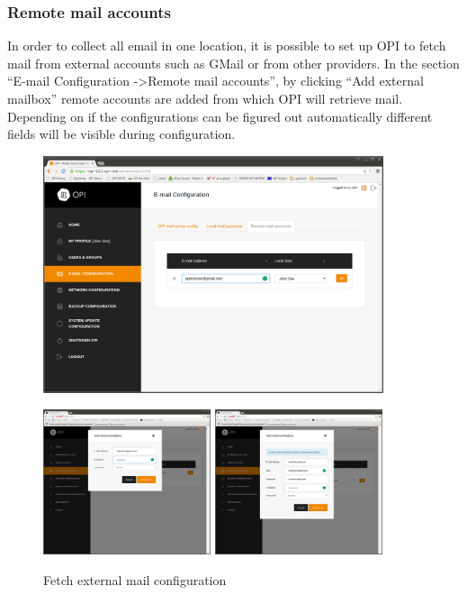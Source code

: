 \documentclass[12pt,a4paper,titlepage]{article}
\begin{document}
\subsubsection{Remote mail accounts}
In order to collect all email in one location, it is possible to set up OPI to fetch mail from external accounts such as GMail or from other providers.
In the section ``E-mail Configuration -\textgreater Remote mail accounts'', by clicking ``Add external mailbox'' remote accounts are added from which OPI will retrieve mail.
Depending on if the configurations can be figured out automatically different fields will be visible during configuration.
\begin{figure}[h!]
\centering
\includegraphics[width=10cm]{./img/fetch-mail-1}

\includegraphics[width=4.93cm]{./img/fetch-mail-2}
\includegraphics[width=4.93cm]{./img/fetch-mail-3}
\caption{Fetch external mail configuration}
\end{figure}
\end{document}

